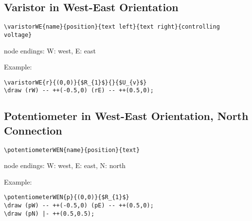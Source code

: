 \documentclass[parskip=full]{scrartcl}
\begin{document}
\subsection{Varistor in West-East Orientation}

\begin{verbatim}
\varistorWE{name}{position}{text left}{text right}{controlling voltage}
\end{verbatim}
node endings: W: west, E: east

Example:\\
\begin{minipage}{0.8\textwidth}
\begin{verbatim}
\varistorWE{r}{(0,0)}{$R_{1}$}{}{$U_{v}$}
\draw (rW) -- ++(-0.5,0) (rE) -- ++(0.5,0);
\end{verbatim}
\end{minipage}
\begin{minipage}{0.19\textwidth}
\end{minipage}

\subsection{Potentiometer in West-East Orientation, North Connection}

\begin{verbatim}
\potentiometerWEN{name}{position}{text}
\end{verbatim}
node endings: W: west, E: east, N: north

Example:\\
\begin{minipage}{0.8\textwidth}
\begin{verbatim}
\potentiometerWEN{p}{(0,0)}{$R_{1}$}
\draw (pW) -- ++(-0.5,0) (pE) -- ++(0.5,0);
\draw (pN) |- ++(0.5,0.5);
\end{verbatim}
\end{minipage}
\begin{minipage}{0.19\textwidth}
\end{minipage}
\end{document}

